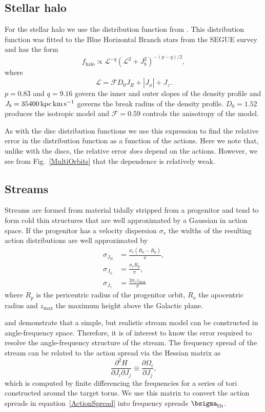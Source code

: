\documentclass[useAMS,usenatbib,fleqn,a4paper]{mn2e}
\def\kpc{\,{\rm kpc}}
\def\kms{\,{\rm km\,s^{-1}}}
\begin{document}
\subsection{Stellar halo}
For the stellar halo we use the distribution function from \cite{Williams2015}. This distribution function was fitted to the Blue Horizontal Branch stars from the SEGUE survey and has the form
\begin{equation}
f_\mathrm{halo}\propto \mathcal{L}^{-q}(\mathcal{L}^2+J_b^2)^{-(p-q)/2},
\end{equation}
where
\begin{equation}
\mathcal{L} = \mathcal{F}D_0 J_R+|J_\phi|+J_z.
\end{equation}
$p=0.83$ and $q=9.16$ govern the inner and outer slopes of the density profile and $J_b=35400\kpc\kms$ governs the break radius of the density profile. $D_0=1.52$ produces the isotropic model and $\mathcal{F}=0.59$ controls the anisotropy of the model.

As with the disc distribution functions we use this expression to find the relative error in the distribution function as a function of the actions. Here we note that, unlike with the discs, the relative error \emph{does} depend on the actions. However, we see from Fig.~\ref{MultiOrbits} that the dependence is relatively weak.

\subsection{Streams}
Streams are formed from material tidally stripped from a progenitor and tend to form cold thin structures that are well approximated by a Gaussian in action space. If the progenitor has a velocity dispersion $\sigma_v$ the widths of the resulting action distributions are well approximated by \citep{EyreBinney2011}
\begin{equation}
\begin{split}
\sigma_{J_R} &= \frac{\sigma_v(R_a-R_p)}{\pi},\\
\sigma_{J_\phi} &= \frac{\sigma_v R_p}{\pi},\\
\sigma_{J_z} &= \frac{2\sigma_v z_\mathrm{max}}{\pi}
\end{split}
\label{ActionSpread}
\end{equation}
where $R_p$ is the pericentric radius of the progenitor orbit, $R_a$ the apocentric radius and $z_\mathrm{max}$ the maximum height above the Galactic plane.

\cite{Bovy2014} and \cite{Sanders2014} demonstrate that a simple, but realistic stream model can be constructed in angle-frequency space. Therefore, it is of interest to know the error required to resolve the angle-frequency structure of the stream. The frequency spread of the stream can be related to the action spread via the Hessian matrix as
\begin{equation}
\frac{\partial^2 H}{\partial J_i \partial J_j}\equiv \frac{\partial \Omega_i}{\partial J_j},
\end{equation}
which is computed by finite differencing the frequencies for a series of tori constructed around the target torus. We use this matrix to convert the action spreads in equation~\eqref{ActionSpread} into frequency spreads $\bsigma_{\Omega i}$.
\end{document}
